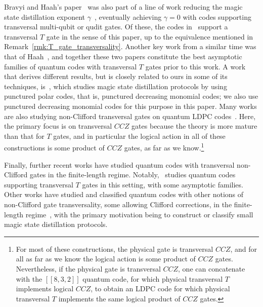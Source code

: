 \documentclass{article}
\begin{document}
Bravyi and Haah's paper~\cite{bravyi2012magic} was also part of a line of work reducing the magic state distillation exponent $\gamma$~\cite{MSD,Meier2013MagicState,Jones2013Multilevel,Haah2017MagicState,hastings2018distillation,krishna2018towards,wills2024,golowich2025asymptotically,nguyen2024good,nguyen2025quantum}, eventually achieving $\gamma = 0$ with codes supporting transversal multi-qubit or qudit gates. Of these, the codes in~\cite{hastings2018distillation} support a transversal $T$ gate in the sense of this paper, up to the equivalence mentioned in Remark~\ref{rmk:T_gate_transversality}. Another key work from a similar time was that of Haah~\cite{haah2018towers}, and together these two papers constitute the best asymptotic families of quantum codes with transversal $T$ gates prior to this work. A work that derives different results, but is closely related to ours in some of its techniques, is~\cite{krishna2018magic}, which studies magic state distillation protocols by using punctured polar codes, that is, punctured decreasing monomial codes; we also use punctured decreasing monomial codes for this purpose in this paper. Many works are also studying non-Clifford transversal gates on quantum LDPC codes~\cite{golowich2025quantum,scruby2024quantum,zhu2025transversal,golowich2025near,zhu2025non,zhu2026non,kobayashi2026clifford,breuckmann2026cups,li2025poincar,li2026transversal}. Here, the primary focus is on transversal $CCZ$ gates because the theory is more mature than that for $T$ gates, and in particular the logical action in all of these constructions is some product of $CCZ$ gates, as far as we know.\footnote{For most of these constructions, the physical gate is transversal $CCZ$, and for all as far as we know the logical action is some product of $CCZ$ gates. Nevertheless, if the physical gate is transversal $CCZ$, one can concatenate with the $[[8,3,2]]$ quantum code, for which physical transversal $T$ implements logical $CCZ$, to obtain an LDPC code for which physical transversal $T$ implements the same logical product of $CCZ$ gates.}

Finally, further recent works have studied quantum codes with transversal non-Clifford gates in the finite-length regime. Notably,~\cite{JainAlbert2025Transversal} studies quantum codes supporting transversal $T$ gates in this setting, with some asymptotic families. Other works have studied and classified quantum codes with other notions of non-Clifford gate transversality, some allowing Clifford corrections, in the finite-length regime~\cite{nezami2022classification,cervia2025magic,Jacinto2026CompactMagicState,Singh2026BorrowedIdentities,Gong2026BinaryExtensionFields}, with the primary motivation being to construct or classify small magic state distillation protocols.
\end{document}
